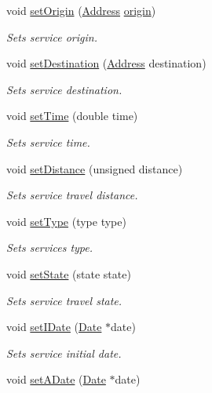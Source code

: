 \begin{DoxyCompactItemize}
void \hyperlink{class_service_af3f248b1ecea5fd3fb0da198bfdbc7d5}{set\+Origin} (\hyperlink{class_address}{Address} \hyperlink{class_service_a4abd0a104d97e5bdb8e8ca93bab31ce7}{origin})
\begin{DoxyCompactList}\small\item\em Sets service origin. \end{DoxyCompactList}\item 
void \hyperlink{class_service_a1c2082379deaf672919165e540afcab2}{set\+Destination} (\hyperlink{class_address}{Address} destination)
\begin{DoxyCompactList}\small\item\em Sets service destination. \end{DoxyCompactList}\item 
void \hyperlink{class_service_aed76805ea044b29f0dafe65a7d39f2dc}{set\+Time} (double time)
\begin{DoxyCompactList}\small\item\em Sets service time. \end{DoxyCompactList}\item 
void \hyperlink{class_service_a6349774a4ab8afffe88dc51025690650}{set\+Distance} (unsigned distance)
\begin{DoxyCompactList}\small\item\em Sets service travel distance. \end{DoxyCompactList}\item 
void \hyperlink{class_service_af26945add8ad6504432fa0c62c8c2769}{set\+Type} (type type)
\begin{DoxyCompactList}\small\item\em Sets service\textquotesingle{}s type. \end{DoxyCompactList}\item 
void \hyperlink{class_service_a7aa57d557be113ce2025843cb1046137}{set\+State} (state state)
\begin{DoxyCompactList}\small\item\em Sets service travel state. \end{DoxyCompactList}\item 
void \hyperlink{class_service_ac4635d11b13279a4ef84b1c6378639d4}{set\+I\+Date} (\hyperlink{class_date}{Date} $\ast$date)
\begin{DoxyCompactList}\small\item\em Sets service initial date. \end{DoxyCompactList}\item 
void \hyperlink{class_service_a80210953169ca04d454db8be48694187}{set\+A\+Date} (\hyperlink{class_date}{Date} $\ast$date)

\end{DoxyCompactItemize}
